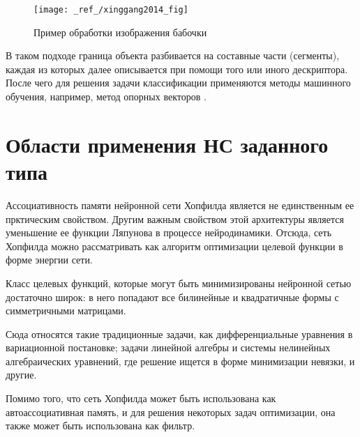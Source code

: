 \documentclass[12pt,a4paper]{article}
\begin{document}
\begin{figure}[H]
	\center
	\texttt{[image: \_ref\_/xinggang2014\_fig]}
	\caption{Пример обработки изображения бабочки \cite{wang2014}}
\end{figure}

В таком подходе граница объекта разбивается на составные части (сегменты), каждая
из которых далее описывается при помощи того или иного дескриптора. После чего
для решения задачи классификации применяются методы машинного обучения, например,
метод опорных векторов \cite{svm}.


\section{Области применения НС заданного типа}
Ассоциативность памяти нейронной сети Хопфилда является не единственным ее прктическим свойством. 
Другим важным свойством этой архитектуры является уменьшение ее функции Ляпунова в процессе нейродинамики. Отсюда, сеть Хопфилда можно рассматривать как алгоритм оптимизации целевой функции в форме энергии сети.

Класс целевых функций, которые могут быть минимизированы нейронной сетью достаточно широк: в него попадают все билинейные и квадратичные формы с симметричными матрицами.

Сюда относятся такие традиционные задачи, как дифференциальные уравнения в вариационной постановке; задачи линейной алгебры и системы нелинейных алгебраических уравнений, где решение ищется в форме минимизации невязки, и другие.

Помимо того, что сеть Хопфилда может быть использована как автоассоциативная память, и для решения некоторых задач оптимизации,
она также может быть использована как фильтр. 

\newpage
\appendix 
{}
\end{document}
